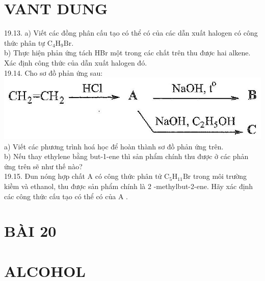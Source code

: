 \documentclass[10pt]{article}
\begin{document}
\section*{VANT DUNG}
19.13. a) Viết các đồng phân cấu tạo có thể có của các dẫn xuất halogen có công thức phân tự $\mathrm{C}_{4} \mathrm{H}_{9} \mathrm{Br}$.\\
b) Thực hiện phản ứng tách HBr một trong các chất trên thu được hai alkene. Xác định công thức của dẫn xuất halogen đó.\\
19.14. Cho sơ đồ phản ứng sau:\\
\includegraphics[max width=\textwidth, center]{2025_10_23_fa9073eecee116ad8cf2g-65}\\
a) Viết các phương trình hoá học để hoàn thành sơ đồ phản ứng trên.\\
b) Nếu thay ethylene bằng but-1-ene thì sản phẩm chính thu được ở các phản ứng trên sẽ như thế nào?\\
19.15. Đun nóng hợp chất A có công thức phân tử $\mathrm{C}_{5} \mathrm{H}_{11} \mathrm{Br}$ trong môi trường kiềm và ethanol, thu được sản phẩm chính là 2 -methylbut-2-ene. Hãy xác định các công thức cấu tạo có thể có của A .

\section*{BÀI 20}
\section*{ALCOHOL}
\end{document}
